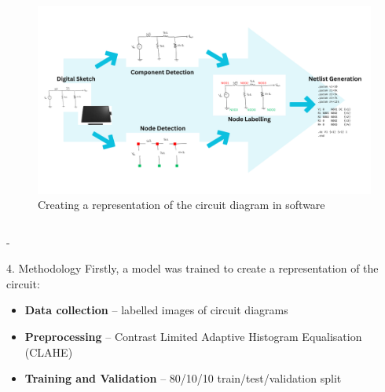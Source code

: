 \documentclass{beamer}
\begin{document}
\begin{frame}[t]
\begin{columns}[t]
    \begin{column}{\colwidth}
      {\beamerblocknoheader
        \begin{block}{}
          \centering
          \begin{figure}[t]
            \includegraphics[width=\colwidth,height=40ex]{../common/graphics/create-representation}
            \caption{Creating a representation of the circuit diagram in software}
            \label{ke2}
          \end{figure}
        \end{block}
      }
      {\beamerblocknoheader
        \begin{alertblock}{}
          \centering
          \begin{column}{\colwidth-\sepwidth}
            {\beamerblockheader
              \RaggedRight

              \begin{block}{4. Methodology}
                \RaggedRight
                Firstly, a model was trained to create a representation of the circuit:
                \begin{itemize}
                  \item \textbf{Data collection} -- labelled images of circuit diagrams
                  \item \textbf{Preprocessing} -- Contrast Limited Adaptive Histogram Equalisation (CLAHE)
                  \item \textbf{Training and Validation} -- 80/10/10 train/test/validation split
                \end{itemize}


\end{block}}
\end{column}
\end{alertblock}}
\end{column}
\end{columns}
\end{frame}
\end{document}
